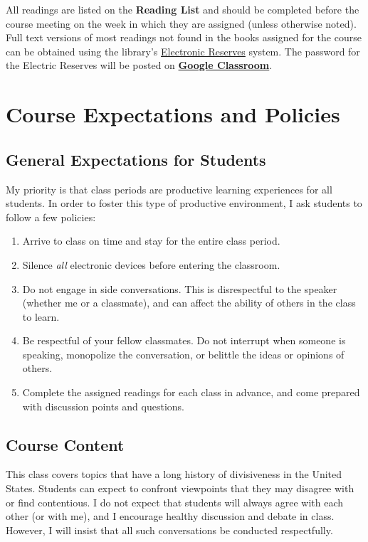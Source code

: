 \documentclass{tufte-book}
\begin{document}
\par All readings are listed on the \textbf{Reading List} and should be completed before the course meeting on the week in which they are assigned (unless otherwise noted). Full text versions of most readings not found in the books assigned for the course can be obtained using the library's \href{http://eres.slu.edu/eres/coursepass.aspx?cid=4443}{Electronic Reserves} system. The password for the Electric Reserves will be posted on \textbf{\href{https://classroom.google.com}{Google Classroom}}.

\chapter{Course Expectations and Policies}
\section{General Expectations for Students}
My priority is that class periods are productive learning experiences for all students. In order to foster this type of productive environment, I ask students to follow a few policies:
\begin{enumerate}[leftmargin=!,labelindent=5pt]
\itemsep-.25em
	\item Arrive to class on time and stay for the entire class period.
	\item Silence \textit{all} electronic devices before entering the classroom.
	\item Do not engage in side conversations. This is disrespectful to the speaker (whether me or a classmate), and can affect the ability of others in the class to learn.
	\item Be respectful of your fellow classmates. Do not interrupt when someone is speaking, monopolize the conversation, or belittle the ideas or opinions of others. 
	\item Complete the assigned readings for each class in advance, and come prepared with discussion points and questions. 
\end{enumerate}

\vspace{3mm}
\section{Course Content}
This class covers topics that have a long history of divisiveness in the United States. Students can expect to confront viewpoints that they may disagree with or find contentious. I do not expect that students will always agree with each other (or with me), and I encourage healthy discussion and debate in class. However, I will insist that all such conversations be conducted respectfully. 
\end{document}
